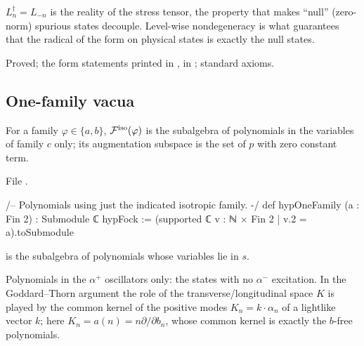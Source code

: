 \begin{physics}
$L_n^\dagger=L_{-n}$ is the reality of the stress tensor, the property that makes ``null'' (zero-norm) spurious
states decouple.  Level-wise nondegeneracy is what guarantees that the radical of the form on physical states
is exactly the null states.
\end{physics}

\begin{status}
Proved; the form statements printed in ,
 in ; standard axioms.
\end{status}

\subsection{One-family vacua}

\begin{definition}\label{ch17:def:onefamily}
For a family $\varphi\in\{a,b\}$, $\mathcal{F}^{\mathrm{iso}}(\varphi)$ is the subalgebra of polynomials in the variables of family
$c$ only; its augmentation subspace is the set of $p$ with zero constant term.
\end{definition}

\noindent File .
\begin{leancode}
/-- Polynomials using just the indicated isotropic family. -/
def hypOneFamily (a : Fin 2) : Submodule ℂ hypFock :=
  (supported ℂ {v : ℕ × Fin 2 | v.2 = a}).toSubmodule
\end{leancode}

\begin{dictionary}
 is the subalgebra of polynomials whose variables lie in $s$.
\end{dictionary}

\begin{physics}
Polynomials in the $\alpha^+$ oscillators only: the states with no $\alpha^-$ excitation.  In the Goddard--Thorn
argument the role of the transverse/longitudinal space $K$ is played by the common kernel of the positive modes
$K_n=k\cdot\alpha_n$ of a lightlike vector $k$; here $K_n=a(n)=n\partial/\partial b_n$, whose common kernel is exactly the $b$-free
polynomials.
\end{physics}

